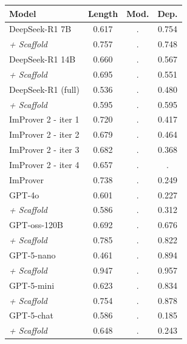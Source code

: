 \begin{tabular}{l|ccc}
\hline
\textbf{Model}  & \textbf{Length} & \textbf{Mod.} & \textbf{Dep.} \\
\hline
DeepSeek-R1 7B & 0.617 & . & 0.754 \\
\textit{+ Scaffold} & 0.757 & . & 0.748 \\
DeepSeek-R1 14B & 0.660 & . & 0.567 \\
\textit{+ Scaffold} & 0.695 & . & 0.551 \\
DeepSeek-R1 (full) & 0.536 & . & 0.480 \\
\textit{+ Scaffold} & 0.595 & . & 0.595 \\
\hdashline
ImProver 2 - iter 1 & 0.720 & . & 0.417 \\
ImProver 2 - iter 2 & 0.679 & . & 0.464 \\
ImProver 2 - iter 3 & 0.682 & . & 0.368 \\
ImProver 2 - iter 4 & 0.657 & . & . \\
\hdashline
ImProver & 0.738 & . & 0.249 \\
GPT-4o & 0.601 & . & 0.227 \\
\textit{+ Scaffold} & 0.586 & . & 0.312 \\
\hdashline
GPT-oss-120B & 0.692 & . & 0.676 \\
\textit{+ Scaffold} & 0.785 & . & 0.822 \\
GPT-5-nano & 0.461 & . & 0.894 \\
\textit{+ Scaffold} & 0.947 & . & 0.957 \\
GPT-5-mini & 0.623 & . & 0.834 \\
\textit{+ Scaffold} & 0.754 & . & 0.878 \\
GPT-5-chat & 0.586 & . & 0.185 \\
\textit{+ Scaffold} & 0.648 & . & 0.243 \\
\hline
\end{tabular}
